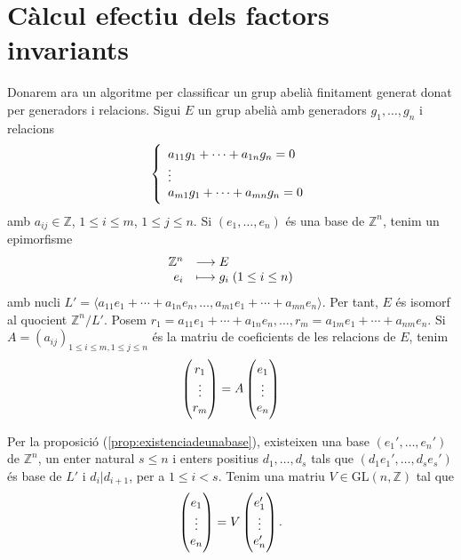 \documentclass[../main.tex]{subfiles}
\begin{document}
\section{Càlcul efectiu dels factors invariants}
Donarem ara un algoritme per classificar un grup abelià finitament generat donat per generadors i relacions. Sigui $E$ un grup abelià amb generadors $g_1,\ldots,g_n$ i relacions
\begin{equation}
    \notag
    \left\{
    \begin{array}{ll}
        a_{11}g_1+\cdots +a_{1n}g_n = 0 \\
        \vdots\\
        a_{m1}g_1+\cdots+a_{mn}g_n = 0
    \end{array}
    \right.
\end{equation}
amb $a_{ij}\in \mathbb{Z}$, $1\leq i\leq m$, $1\leq j\leq n$. Si $(e_1,\ldots,e_n)$ és una base de $\mathbb{Z}^n$, tenim un epimorfisme
\begin{equation}
    \notag
    \begin{array}{rl}
        \mathbb{Z}^n & \longrightarrow E \\
        e_i & \longmapsto g_i\;(1\leq i\leq n)
    \end{array}
\end{equation}
amb nucli $L' = \langle a_{11}e_1+\cdots+a_{1n}e_n,\ldots,a_{m1}e_1+\cdots+a_{mn}e_n\rangle$. Per tant, $E$ és isomorf al quocient $\mathbb{Z}^n/L'$. Posem $r_1 = a_{11}e_1+\cdots+a_{1n}e_n,\ldots, r_m = a_{1m}e_1+\cdots+a_{nm}e_n$. Si $A = (a_{ij})_{1\leq i\leq m,1\leq j\leq n}$ és la matriu de coeficients de les relacions de $E$, tenim
\begin{equation}
    \notag
    \begin{pmatrix}
        r_1\\
        \vdots \\
        r_m
    \end{pmatrix}
    =
    A
    \begin{pmatrix}
    e_1\\\vdots\\e_n
    \end{pmatrix}
\end{equation}

Per la proposició (\ref{prop:existenciadeunabase}), existeixen una base $(e_1',\ldots,e_n')$ de $\mathbb{Z}^n$, un enter natural $s\leq n$ i enters positius $d_1,\ldots, d_s$ tals que $(d_1e_1',\ldots,d_se_s')$ és base de $L'$ i $d_i|d_{i+1}$, per a $1\leq i < s$. Tenim una matriu $V\in \text{GL}(n,\mathbb{Z})$ tal que
\begin{equation}
    \notag
    \begin{pmatrix}e_1\\\vdots\\e_n\end{pmatrix} = V\begin{pmatrix}e_1'\\\vdots\\e_n'\end{pmatrix} .
\end{equation}
\end{document}
